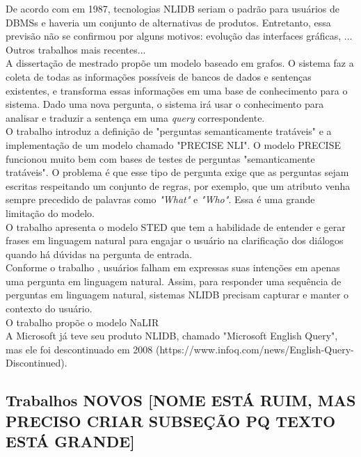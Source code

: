 \documentclass{article}
\begin{document}
De acordo com \citep{johnson1984natural} em 1987, tecnologias NLIDB seriam o padrão para usuários de DBMSs e haveria um conjunto de alternativas de produtos. Entretanto, essa previsão não se confirmou por alguns motivos: evolução das interfaces gráficas, ...\\

Outros trabalhos mais recentes...\\

A dissertação de mestrado \citep{chandra2006natural} propõe um modelo baseado em grafos. O sistema faz a coleta de todas as informações possíveis de bancos de dados e sentenças existentes, e transforma essas informações em uma base de conhecimento para o sistema. Dado uma nova pergunta, o sistema irá usar o conhecimento para analisar e traduzir a sentença em uma \textit{query} correspondente. \\

O trabalho \cite{popescu2003towards} introduz a definição de "perguntas semanticamente tratáveis" e a implementação de um modelo chamado "PRECISE NLI". O modelo PRECISE funcionou muito bem com bases de testes de perguntas "semanticamente tratáveis". O problema é que esse tipo de pergunta exige que as perguntas sejam escritas respeitando um conjunto de regras, por exemplo, que um atributo venha sempre precedido de palavras como \textit{"What"} e \textit{"Who"}. Essa é uma grande limitação do modelo. \\

O trabalho \citep{minock2005phrasal} apresenta o modelo STED que tem a habilidade de entender e gerar frases em linguagem natural para engajar o usuário na clarificação dos diálogos quando há dúvidas na pergunta de entrada. \\

Conforme o trabalho \citep{akula2013novel}, usuários falham em expressas suas intenções em apenas uma pergunta em linguagem natural. Assim, para responder uma sequência de perguntas em linguagem natural, sistemas NLIDB precisam capturar e manter o contexto do usuário. \\

O trabalho \citep{li2014constructing} propõe o modelo NaLIR \\

A Microsoft já teve seu produto NLIDB, chamado "Microsoft English Query", mas ele foi descontinuado em 2008 (https://www.infoq.com/news/English-Query-Discontinued).\\

\subsection{Trabalhos NOVOS [NOME ESTÁ RUIM, MAS PRECISO CRIAR SUBSEÇÃO PQ TEXTO ESTÁ GRANDE]}
\end{document}
